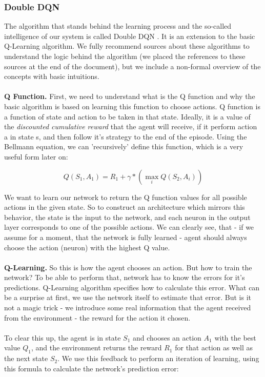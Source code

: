 \documentclass{article}
\begin{document}
\subsubsection{Double DQN}

The algorithm that stands behind the learning process and the so-called intelligence of our system is called Double DQN \cite{doubledqn_paper}. It is an extension to the basic Q-Learning algorithm. We fully recommend sources about these algorithms to understand the logic behind the algorithm (we placed the references to these sources at the end of the document), but we include a non-formal overview of the concepts with basic intuitions.
\\\\
\textbf{Q Function.} First, we need to understand what is the Q function and why the basic algorithm is based on learning this function to choose actions. Q function is a function of state and action to be taken in that state. Ideally, it is a value of the \textit{discounted cumulative reward} that the agent will receive, if it perform action a in state s, and then follow it's strategy to the end of the episode. Using the Bellmann equation, we can 'recursively' define this function, which is a very useful form later on:

\[ Q(S_{1}, A_{1}) = R_{1} + \gamma * (\max_{i} Q(S_{2}, A_{i}))\]

We want to learn our network to return the Q function values for all possible actions in the given state. So to construct an architecture which mirrors this behavior, the state is the input to the network, and each neuron in the output layer corresponds to one of the possible actions. We can clearly see, that - if we assume for a moment, that the network is fully learned - agent should always choose the action (neuron) with the highest Q value.
\\\\
\textbf{Q-Learning.} So this is how the agent chooses an action. But how to train the network? To be able to perform that, network has to know the errors for it's predictions. Q-Learning algorithm specifies how to calculate this error. What can be a surprise at first, we use the network itself to estimate that error. But is it not a magic trick - we introduce some real information that the agent received from the environment - the reward for the action it chosen. 
\\\\
To clear this up, the agent is in state $S_{1}$ and chooses an action $A_{1}$ with the best value $Q_{1}$, and the environment returns the reward $R_{1}$ for that action as well as the next state $S_{2}$. We use this feedback to perform an iteration of learning, using this formula to calculate the network's prediction error:
\end{document}
